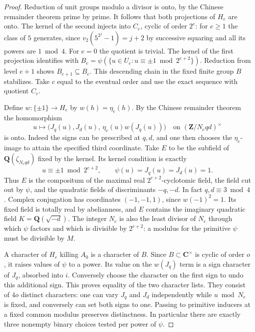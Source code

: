 \begin{proof}
Reduction of unit groups modulo a divisor is onto, by the Chinese
remainder theorem prime by prime. It follows that both projections of
\(H_e\) are onto. The kernel of the second injects into \(C_e\), cyclic
of order \(2^e\): for \(e\ge1\) the class of \(5\) generates, since
\(v_2(5^{2^j}-1)=j+2\) by successive squaring and all its powers are
\(1\bmod4\). For \(e=0\) the quotient is trivial. The kernel of the first
projection identifies with \(B_e=\psi(\{u\in U_e:u\equiv\pm1\bmod
2^{e+2}\})\). Reduction from level \(e+1\) shows \(B_{e+1}\subseteq B_e\).
This descending chain in the fixed finite group \(B\) stabilizes. Take
\(c\) equal to the eventual order and use the exact sequence with quotient
\(C_e\).

Define \(w:\{\pm1\}\to H_e\) by \(w(h)=\eta_e(h)\).
By the Chinese remainder theorem the homomorphism
\[
    u\longmapsto
    \bigl(J_q(u),J_d(u),\,\eta_e(u)w(J_q(u))\bigr)
       \quad\text{on }(\mathbf Z/N_eqd)^\times
\]
is onto. Indeed the signs can be prescribed at \(q,d\), and one then
chooses the \(\eta_e\)-image to attain the specified third coordinate.
Take \(E\) to be the subfield of \(\mathbf Q(\zeta_{N_e qd})\) fixed
by the kernel. Its kernel condition is exactly
\[
 u\equiv\pm1\bmod 2^{e+2},\qquad \psi(u)=J_q(u)=J_d(u)=1.
\]
Thus \(E\) is the compositum of the maximal real \(2^{e+2}\)-cyclotomic
field, the field cut out by \(\psi\), and the quadratic fields of
discriminants \(-q,-d\). In fact \(q,d\equiv3\bmod4\).
Complex conjugation has coordinates \((-1,-1,1)\), since \(w(-1)^2=1\).
Its fixed field is totally real by abelianness, and \(E\) contains the
imaginary quadratic field \(K=\mathbf Q(\sqrt{-d})\).
The integer \(N_e\) is also the least divisor of \(N_e\) through which
\(\psi\) factors and which is divisible by \(2^{e+2}\): a modulus for
the primitive \(\psi\) must be divisible by \(M\).

A character of \(H_e\) killing \(A_0\) is a character of \(B\). Since
\(B\subset\mathbf C^\times\) is cyclic of order \(o\), it raises values
of \(\psi\) to a power. Its value on the \(w(J_q)\) term is a sign
character of \(J_q\), absorbed into \(i\). Conversely choose the character
on the first sign to undo this additional sign. This proves equality of
the two character lists. They consist of \(4o\) distinct characters:
one can vary \(J_q\) and \(J_d\) independently while \(u\bmod N_e\) is
fixed, and conversely can set both signs to one. Passing to primitive
inducers at a fixed common modulus preserves distinctness. In particular
there are exactly three nonempty binary choices tested per power of \(\psi\).
\end{proof}

